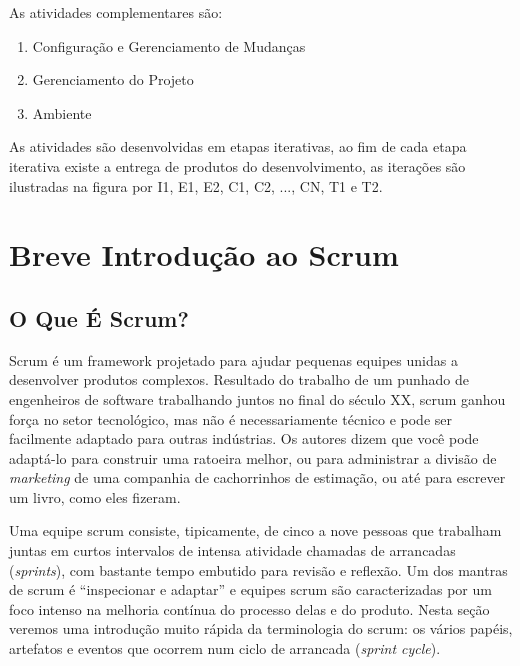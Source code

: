 \documentclass[
	11pt,				%
	openright,
	twoside,			%
	a4paper,			%
	english,			%
	french,
	brazil,				%
	sumario=tradicional
	]{abntex2}
\begin{document}
As atividades complementares são:
\begin{enumerate}
\item Configuração e Gerenciamento de Mudanças
\item Gerenciamento do Projeto
\item Ambiente
\end{enumerate}

As atividades são desenvolvidas em etapas iterativas, ao fim de cada etapa iterativa existe a entrega de produtos do desenvolvimento, as iterações são ilustradas na figura por I1, E1, E2,   C1, C2, ..., CN, T1 e T2.

\section{Breve Introdução ao Scrum} \label{s:scrum}

\subsection{O Que É Scrum?}
Scrum é um framework projetado para ajudar pequenas equipes unidas a desenvolver produtos complexos. Resultado do trabalho de um punhado de engenheiros de software trabalhando juntos no final do século XX, scrum ganhou força no setor tecnológico, mas não é necessariamente técnico e pode ser facilmente adaptado para outras indústrias. Os autores  dizem que você pode adaptá-lo para construir uma ratoeira melhor, ou para administrar a divisão de \textit{marketing} de uma companhia de cachorrinhos de estimação, ou até para escrever um livro, como eles fizeram.

Uma equipe scrum consiste, tipicamente, de cinco a nove pessoas que trabalham juntas em curtos intervalos de intensa atividade chamadas de arrancadas (\emph{sprints}), com bastante tempo embutido para revisão e reflexão. Um dos mantras de scrum é ``inspecionar e adaptar'' e equipes scrum são caracterizadas por um foco intenso  na melhoria contínua do processo delas e do produto. Nesta seção veremos uma introdução muito rápida da terminologia do scrum: os vários papéis, artefatos e eventos que ocorrem num ciclo de arrancada (\emph{sprint cycle}).
\end{document}
